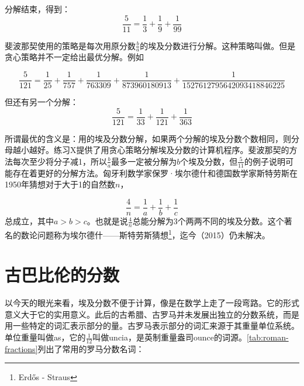 \documentclass[b5paper]{ctexart}
\begin{document}
分解结束，得到：
\[
\frac{5}{11} = \frac{1}{3} + \frac{1}{9} + \frac{1}{99}
\]

斐波那契使用的策略是每次用原分数$\frac{b}{a}$的埃及分数进行分解。这种策略叫做。但是贪心策略并不一定给出最优分解。例如

\[
\frac{5}{121} = \frac{1}{25} + \frac{1}{757} + \frac{1}{763309} + \frac{1}{873960180913} + \frac{1}{1527612795642093418846225}
\]

但还有另一个分解：
\[
\frac{5}{121} = \frac{1}{33} + \frac{1}{121} + \frac{1}{363}
\]

所谓最优的含义是：用的埃及分数分解，如果两个分解的埃及分数个数相同，则分母越小越好。练习X提供了用贪心策略分解埃及分数的计算机程序。斐波那契的方法每次至少将分子减1，所以$\frac{b}{a}$最多一定被分解为$b$个埃及分数，但$\frac{5}{11}$的例子说明可能存在着更好的分解方法。匈牙利数学家保罗·埃尔德什和德国数学家斯特劳斯在1950年猜想对于大于1的自然数$n$，

\[
\frac{4}{n} = \frac{1}{a} + \frac{1}{b} + \frac{1}{c}
\]
总成立，其中$a > b > c$。也就是说$\frac{4}{n}$总能分解为3个两两不同的埃及分数。这个著名的数论问题称为埃尔德什——斯特劳斯猜想\footnote{Erdős - Straus}，迄今（2015）仍未解决。

\section{古巴比伦的分数}
以今天的眼光来看，埃及分数不便于计算，像是在数学上走了一段弯路。它的形式意义大于它的实用意义。此后的古希腊、古罗马并未发展出独立的分数系统，而是用一些特定的词汇表示部分的量。古罗马表示部分的词汇来源于其重量单位系统。单位重量叫做as，它的$\frac{1}{12}$叫做uncia，是英制重量盎司ounce的词源。\cref{tab:roman-fractions}列出了常用的罗马分数名词：
\end{document}
